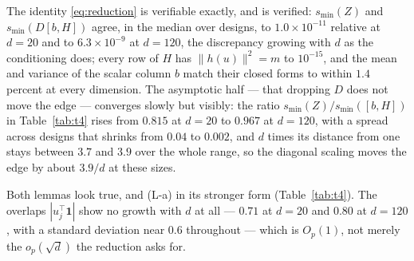 \documentclass[11pt]{article}
\theoremstyle{definition}
\newcommand{\numBmomWorst}{1.4}
\newcommand{\numDratioMax}{3.9}
\newcommand{\numDratioMin}{3.7}
\newcommand{\numHardDmax}{120}
\newcommand{\numHardDmin}{20}
\newcommand{\numOverlapFirst}{0.71}
\newcommand{\numOverlapLast}{0.80}
\newcommand{\numRedMedFirst}{1.0\times10^{-11}}
\newcommand{\numRedMedLast}{6.3\times10^{-9}}
\newcommand{\numSminRatioFirst}{0.815}
\newcommand{\numSminRatioLast}{0.967}
\newcommand{\numSminSdFirst}{0.04}
\newcommand{\numSminSdLast}{0.002}
\begin{document}
The identity \eqref{eq:reduction} is verifiable exactly, and is verified:
$s_{\min}(Z)$ and $s_{\min}(D[b,H])$ agree, in the median over designs, to $\numRedMedFirst$
relative at $d=\numHardDmin$ and to $\numRedMedLast$ at $d=\numHardDmax$, the discrepancy growing
with $d$ as the conditioning does; every row of $H$ has $\|h(u)\|^2=m$ to $10^{-15}$, and the mean
and variance of the scalar
column $b$ match their closed forms to within $\numBmomWorst$ percent at every dimension. The
asymptotic half --- that dropping $D$ does not move the edge --- converges slowly but visibly: the
ratio $s_{\min}(Z)/s_{\min}([b,H])$ in Table~\ref{tab:t4} rises from $\numSminRatioFirst$ at
$d=\numHardDmin$ to $\numSminRatioLast$ at $d=\numHardDmax$, with a spread across designs that shrinks
from $\numSminSdFirst$ to $\numSminSdLast$, and $d$ times its distance from one stays between
$\numDratioMin$ and $\numDratioMax$ over the whole range, so the diagonal scaling moves the edge by
about $3.9/d$ at these sizes.

Both lemmas look true, and (L-a) in its stronger form (Table~\ref{tab:t4}). The overlaps
$|u_j^\top\mathbf 1|$ show no growth with $d$ at all --- $\numOverlapFirst$ at $d=\numHardDmin$ and
$\numOverlapLast$ at $d=\numHardDmax$, with a standard deviation near $0.6$ throughout --- which is
$O_p(1)$, not merely the $o_p(\sqrt d)$ the reduction asks for.
\end{document}
